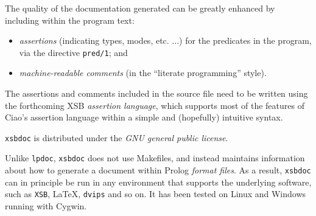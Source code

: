 The quality of the documentation generated can be greatly enhanced by
including within the program text:

\begin{itemize}

\item {\em assertions} (indicating types, modes, etc. ...) for the
predicates in the program, via the directive {\tt pred/1}; and

\item {\em machine-readable comments} (in the ``literate programming''
style).

\end{itemize}

The assertions and comments included in the source file need to be
written using the forthcoming XSB {\em assertion language}, which
supports most of the features of Ciao's assertion language within a
simple and (hopefully) intuitive syntax.

{\tt xsbdoc} is distributed under the {\em GNU general public
license}.

Unlike {\tt lpdoc}, {\tt xsbdoc} does not use Makefiles, and instead
maintains information about how to generate a document within Prolog
{\em format files}.  As a result, {\tt xsbdoc} can in principle be run
in any environment that supports the underlying software, such as
{\tt XSB}, \LaTeX, {\tt dvips} and so on.  It has been tested on
Linux and Windows running with Cygwin.

